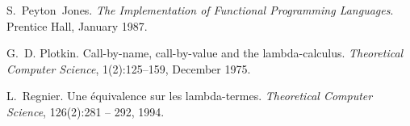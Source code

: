 \documentclass[xchauthor,chkrefs,GCNS,amsmath,amsthm,rotating,leaveRGB]{tcsg}
\theoremstyle{plain}
\theoremstyle{definition}
\begin{document}
\begin{backmatter}
\begin{thebibliography}{}
\begin{bsubitem}
\begin{bcontribution}%
\end{bcontribution}
\begin{bhost}
\begin{bbook}
\end{bbook}
\end{bhost}
\end{bsubitem}
%
\OrigBibText
S.~Peyton~Jones.
 \emph{The Implementation of Functional Programming Languages}.
 Prentice Hall, January 1987.
\endOrigBibText
{}%
\endbibitem

\begin{bsubitem}
\begin{bcontribution}%
\end{bcontribution}
\begin{bhost}
\begin{bissue}
\end{bissue}
\end{bhost}
\end{bsubitem}
%
\OrigBibText
G.~D. Plotkin.
 Call-by-name, call-by-value and the lambda-calculus.
 \emph{Theoretical Computer Science}, 1(2):125--159, December 1975.
\endOrigBibText
{}%
\endbibitem

\begin{bsubitem}
\begin{bcontribution}[language=fr]%
\end{bcontribution}
\begin{bhost}
\begin{bissue}
\end{bissue}
\end{bhost}
\end{bsubitem}
%
\OrigBibText
L.~Regnier.
 Une \'equivalence sur les lambda-termes.
 \emph{Theoretical Computer Science}, 126(2):281 -- 292, 1994.
\endOrigBibText
{}%
\endbibitem

\end{thebibliography}

\end{backmatter}
\end{document}
